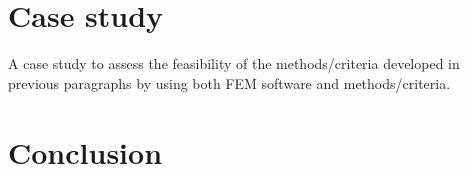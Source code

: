 
\chapter{Case study}

A case study to assess the feasibility of the methods/criteria developed in previous paragraphs by using both FEM software and methods/criteria. 


\chapter{Conclusion}

